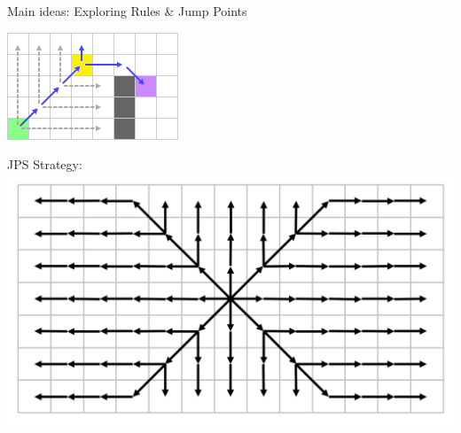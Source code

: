 \documentclass{presentation}
\begin{document}
\begin{frame}{Main ideas: Exploring Rules \& Jump Points}
\begin{center}
\begin{minipage}{0.3\textwidth}
		\end{minipage}%
		\hfill%
		\begin{minipage}{0.3\textwidth}
			\includegraphics[width=\textwidth]{figures/extra_geschnitten/dm(jump).png}
		\end{minipage}%
	\end{center}
\end{frame}


\begin{frame}
	\begin{center}
		JPS Strategy:\\
		\vspace{5mm}
		\includegraphics[width=\textwidth]{figures/jps_strategy.png}
	\end{center}
\end{frame}
\end{document}

